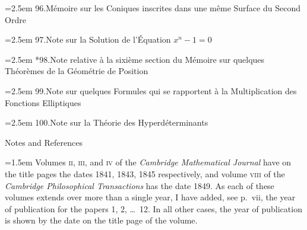 \documentclass[11pt]{article}
\begin{document}
\noindent\hangindent=2.5em
96.\quad M\'emoire sur les Coniques inscrites dans une m\^eme Surface du Second Ordre\par
\hspace{1.5em}{\small Crelle, t.~xli.\ (1851), pp.~73--86}\par

\noindent\hangindent=2.5em
97.\quad Note sur la Solution de l'\'Equation $x^{n}-1=0$\par
\hspace{1.5em}{\small Crelle, t.~xli.\ (1851), pp.~81--83}\par

\noindent\hangindent=2.5em
*98.\quad Note relative \`a la sixi\`eme section du M\'emoire sur quelques Th\'eor\`emes de la G\'eom\'etrie de Position\par
\hspace{1.5em}{\small Crelle, t.~xli.\ (1851), p.~84}\par

\noindent\hangindent=2.5em
99.\quad Note sur quelques Formules qui se rapportent \`a la Multiplication des Fonctions Elliptiques\par
\hspace{1.5em}{\small Crelle, t.~xli.\ (1851), pp.~85--92}\par

\noindent\hangindent=2.5em
100.\quad Note sur la Th\'eorie des Hyperd\'eterminants\par
\hspace{1.5em}{\small Crelle, t.~xlii.\ (1851), pp.~368--371}\par

\bigskip

\noindent Notes and References\par

\bigskip

\noindent\hangindent=1.5em\small
Volumes \textsc{ii}, \textsc{iii}, and \textsc{iv} of the \textit{Cambridge Mathematical Journal} have on the title pages the dates 1841, 1843, 1845 respectively, and volume \textsc{viii} of the \textit{Cambridge Philosophical Transactions} has the date 1849. As each of these volumes extends over more than a single year, I have added, see p.~vii, the year of publication for the papers 1, 2, \dots\ 12. In all other cases, the year of publication is shown by the date on the title page of the volume.\normalsize

\clearpage
\end{document}
